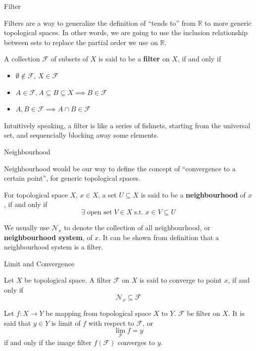 \documentclass[aspectratio=169]{beamer}
\newcommand{\R}{\mathbb{R}}
\newcommand{\msg}[1]{\; \text{#1} \;}
\newcommand{\st}{\msg{s.t.}}
\begin{document}
	\begin{frame}{Filter}
		
		Filters are a way to generalize the definition of ``tends to'' from $\R$ to more generic topological spaces. In other words, we are going to use the inclusion relationship between sets to replace the partial order we use on $\R$.
		
		\begin{definition}
			A collection $\mathcal F$ of subsets of $X$ is said to be a \textbf{filter} on $X$, if and only if
			\begin{itemize}
				\item $\emptyset \notin \mathcal F$, $X \in \mathcal F$
				\item $A \in \mathcal F, A \subseteq B \subseteq X \implies B \in \mathcal F$
				\item $A, B \in \mathcal F \implies A \cap B \in \mathcal F$
			\end{itemize}
		\end{definition}
		
		Intuitively speaking, a filter is like a series of fishnets,
		starting from the universal set, and sequencially blocking away some elements.
		
	\end{frame}
	
	\begin{frame}{Neighbourhood}
		
		Neighbourhood would be our way to define the concept of ``convergence to a certain point'', for generic topological spaces.
		
		\begin{definition}[Neighbourhood]
			For topological space $X$, $x \in X$,
			a set $U \subseteq X$ is said to be a \textbf{neighbourhood} of $x$, if and only if
			$$
			\exists \msg{open set} V \in X \st x \in V \subseteq U
			$$
		\end{definition}
		
		We usually use $\mathcal N_x$ to denote the collection of all neighbourhood, or \textbf{neighbourhood system}, of $x$. It can be shown from definition that a neighbourhood system is a filter.
		
	\end{frame}
	
	\begin{frame}{Limit and Convergence}
		
		\begin{definition}[Convergence]
			Let $X$ be topological space.
			A filter $\mathcal F$ on $X$ is said to converge to point $x$, if and only if
			$$
			\mathcal N_x \subseteq \mathcal F
			$$
		\end{definition}
		
		\begin{definition}[Limit]
			Let $f: X \to Y$ be mapping from topological space $X$ to $Y$.
			$\mathcal F$ be filter on $X$.
			It is said that $y \in Y$ is limit of $f$ with respect to $\mathcal F$, or
			$$
			\lim_\mathcal F f = y
			$$
			if and only if the image filter $f(\mathcal F)$ converges to $y$.
		\end{definition}
		
	\end{frame}
	
\end{document}
